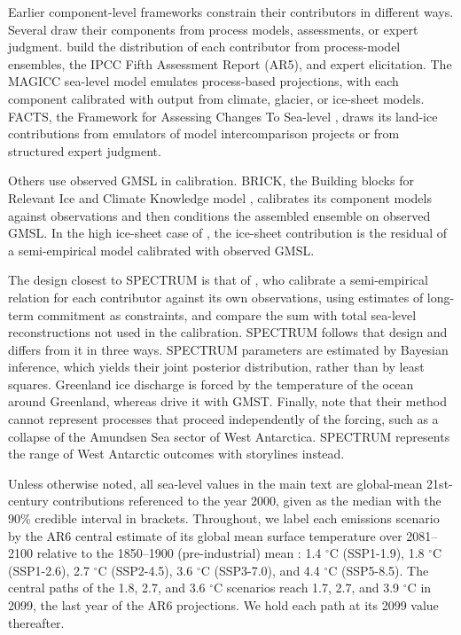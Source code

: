 \documentclass[draft,linenumbers]{agujournal2025}
\begin{document}
Earlier component-level frameworks constrain their contributors in different ways. Several draw their components from process models, assessments, or expert judgment. \citet{Kopp2014} build the distribution of each contributor from process-model ensembles, the IPCC Fifth Assessment Report (AR5), and expert elicitation. The MAGICC sea-level model \citep{Nauels2017} emulates process-based projections, with each component calibrated with output from climate, glacier, or ice-sheet models. FACTS, the Framework for Assessing Changes To Sea-level \citep{Kopp2023}, draws its land-ice contributions from emulators of model intercomparison projects or from structured expert judgment.

Others use observed GMSL in calibration. BRICK, the Building blocks for Relevant Ice and Climate Knowledge model \citep{Wong2017}, calibrates its component models against observations and then conditions the assembled ensemble on observed GMSL. In the high ice-sheet case of \citet{Perrette2013}, the ice-sheet contribution is the residual of a semi-empirical model calibrated with observed GMSL.

The design closest to SPECTRUM is that of \citet{Mengel2016}, who calibrate a semi-empirical relation for each contributor against its own observations, using estimates of long-term commitment as constraints, and compare the sum with total sea-level reconstructions not used in the calibration. SPECTRUM follows that design and differs from it in three ways. SPECTRUM parameters are estimated by Bayesian inference, which yields their joint posterior distribution, rather than by least squares. Greenland ice discharge is forced by the temperature of the ocean around Greenland, whereas \citet{Mengel2016} drive it with GMST. Finally, \citet{Mengel2016} note that their method cannot represent processes that proceed independently of the forcing, such as a collapse of the Amundsen Sea sector of West Antarctica. SPECTRUM represents the range of West Antarctic outcomes with storylines instead.

Unless otherwise noted, all sea-level values in the main text are global-mean 21st-century contributions referenced to the year 2000, given as the median with the 90\% credible interval in brackets. Throughout, we label each emissions scenario by the AR6 central estimate of its global mean surface temperature over 2081--2100 relative to the 1850--1900 (pre-industrial) mean \citep[][Table~4.5]{Lee2021}: 1.4 $^\circ$C (SSP1-1.9), 1.8 $^\circ$C (SSP1-2.6), 2.7 $^\circ$C (SSP2-4.5), 3.6 $^\circ$C (SSP3-7.0), and 4.4 $^\circ$C (SSP5-8.5). The central paths of the 1.8, 2.7, and 3.6 $^\circ$C scenarios reach 1.7, 2.7, and 3.9 $^\circ$C in 2099, the last year of the AR6 projections. We hold each path at its 2099 value thereafter.
\end{document}
